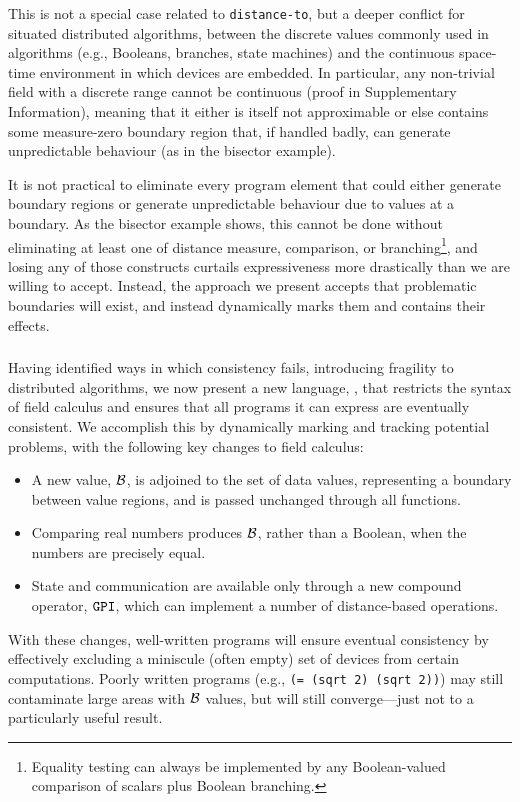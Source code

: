 \documentclass[12pt,a4paper,twoside,openright]{book}
\begin{document}
This is not a special case related to {\tt distance-to}, but a deeper conflict for situated distributed algorithms, between the discrete values commonly used in algorithms (e.g., Booleans, branches, state machines) and the continuous space-time environment in which devices are embedded.
%
In particular, any non-trivial field with a discrete range cannot be continuous (proof in Supplementary Information), meaning that it either is itself not approximable or else contains some measure-zero boundary region that, if handled badly, can generate unpredictable behaviour (as in the bisector example).

It is not practical to eliminate every program element that could either generate boundary regions or generate unpredictable behaviour due to values at a boundary.
%
As the bisector example shows, this cannot be done without eliminating at least one of distance measure, comparison, or branching\footnote{Equality testing can always be implemented by any Boolean-valued comparison of scalars plus Boolean branching.}, and losing any of those constructs curtails expressiveness more drastically than we are willing to accept.
%
Instead, the approach we present accepts that problematic boundaries will exist, and instead dynamically marks them and contains their effects.

\subsubsection{\calculus}
\label{s:calculus}

Having identified ways in which consistency fails, introducing fragility to distributed algorithms, we now present a new language, \calculus{}, that restricts the syntax of field calculus and ensures that all programs it can express are eventually consistent.
%
We accomplish this by dynamically marking and tracking potential problems, with the following key changes to field calculus:
\begin{itemize}
\item A new value, $\mathcal{B}$, is adjoined to the set of data values, representing a boundary between value regions, and is passed unchanged through all functions.
\item Comparing real numbers produces $\mathcal{B}$, rather than a Boolean, when the numbers are precisely equal.
\item State and communication are available only through a new compound operator, $\texttt{GPI}$, which can implement a number of distance-based operations.
\end{itemize}
With these changes, well-written programs will ensure eventual consistency by effectively excluding a miniscule (often empty) set of devices from certain computations.
%
Poorly written programs (e.g., {\tt (= (sqrt 2) (sqrt 2))}) may still contaminate large areas with $\mathcal{B}$ values, but will still converge---just not to a particularly useful result.
\end{document}
